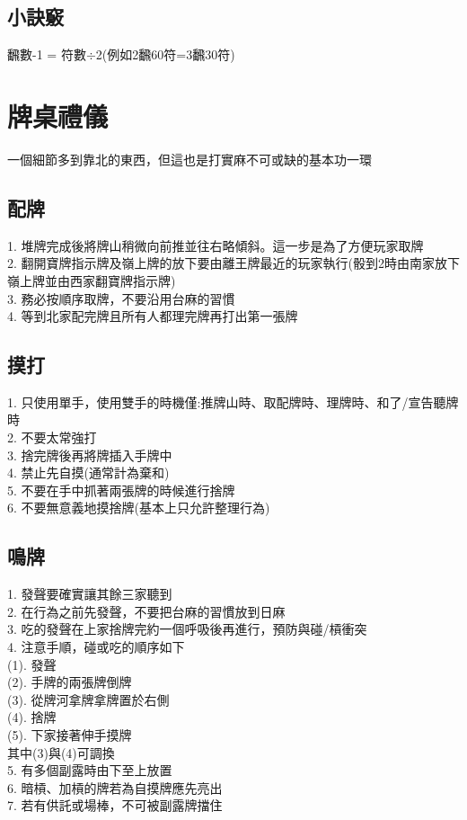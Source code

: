 \documentclass[a4paper,12pt]{article}
\begin{document}
\subsection*{小訣竅}
飜數-1 = 符數$\div$2(例如2飜60符=3飜30符)
\section{牌桌禮儀}
一個細節多到靠北的東西，但這也是打實麻不可或缺的基本功一環
\subsection{配牌}
1. 堆牌完成後將牌山稍微向前推並往右略傾斜。這一步是為了方便玩家取牌 \\
2. 翻開寶牌指示牌及嶺上牌的放下要由離王牌最近的玩家執行(骰到2時由南家放下嶺上牌並由西家翻寶牌指示牌) \\
3. 務必按順序取牌，不要沿用台麻的習慣 \\
4. 等到北家配完牌且所有人都理完牌再打出第一張牌\\
\subsection{摸打}
1. 只使用單手，使用雙手的時機僅:推牌山時、取配牌時、理牌時、和了/宣告聽牌時 \\
2. 不要太常強打 \\
3. 捨完牌後再將牌插入手牌中 \\
4. 禁止先自摸(通常計為棄和) \\
5. 不要在手中抓著兩張牌的時候進行捨牌 \\
6. 不要無意義地摸捨牌(基本上只允許整理行為) \\
\subsection{鳴牌}
1. 發聲要確實讓其餘三家聽到 \\
2. 在行為之前先發聲，不要把台麻的習慣放到日麻 \\
3. 吃的發聲在上家捨牌完約一個呼吸後再進行，預防與碰/槓衝突 \\
4. 注意手順，碰或吃的順序如下 \\
    (1). 發聲 \\
    (2). 手牌的兩張牌倒牌 \\
    (3). 從牌河拿牌拿牌置於右側 \\
    (4). 捨牌 \\
    (5). 下家接著伸手摸牌 \\
其中(3)與(4)可調換 \\
5. 有多個副露時由下至上放置 \\
6. 暗槓、加槓的牌若為自摸牌應先亮出 \\
7. 若有供託或場棒，不可被副露牌擋住 \\
\end{document}
